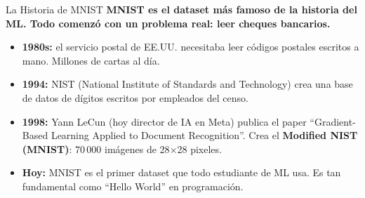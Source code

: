 \documentclass[aspectratio=169, 11pt]{beamer}
\begin{document}
\begin{frame}{La Historia de MNIST}
  \vspace{-4pt}
  {\footnotesize\color{arcaDark}\bfseries
    MNIST es el dataset m\'as famoso de la historia del ML.
    Todo comenz\'o con un problema real: leer cheques bancarios.}

  \vspace{6pt}
  {\footnotesize
  \begin{itemize}\setlength{\itemsep}{4pt}
    \item[{\color{arcaRed}\scriptsize\faArrowRight}]
      \textbf{1980s:} el servicio postal de EE.UU. necesitaba leer
      c\'odigos postales escritos a mano. Millones de cartas al d\'ia.
    \item[{\color{arcaRed}\scriptsize\faArrowRight}]
      \textbf{1994:} NIST (National Institute of Standards and Technology)
      crea una base de datos de d\'igitos escritos por empleados del censo.
    \item[{\color{arcaRed}\scriptsize\faArrowRight}]
      \textbf{1998:} Yann LeCun (hoy director de IA en Meta) publica
      el paper ``Gradient-Based Learning Applied to Document Recognition''.
      Crea el \textbf{Modified NIST (MNIST)}: 70\,000 im\'agenes de
      28$\times$28 pixeles.
    \item[{\color{codeGreen}\scriptsize\faArrowRight}]
      \textbf{Hoy:} MNIST es el primer dataset que todo estudiante de ML
      usa. Es tan fundamental como ``Hello World'' en programaci\'on.
  \end{itemize}
  }
\end{frame}
\end{document}
